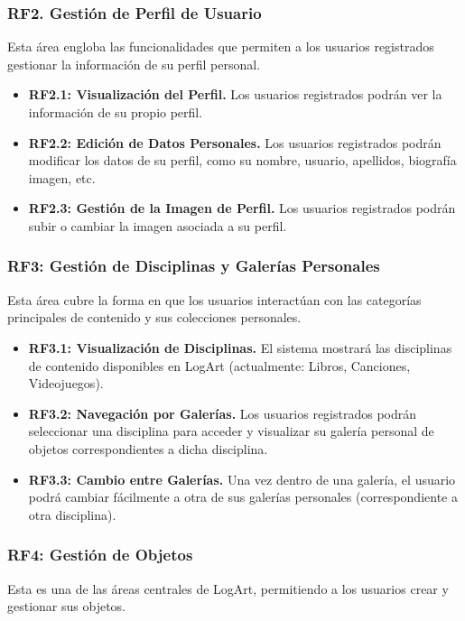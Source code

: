 \subsubsection{RF2. Gestión de Perfil de Usuario}
\label{rf:perfilUsuario}
Esta área engloba las funcionalidades que permiten a los usuarios registrados gestionar la información de su perfil personal.

\begin{itemize}
    \item \textbf{RF2.1: Visualización del Perfil.} Los usuarios registrados podrán ver la información de su propio perfil.
    \item \textbf{RF2.2: Edición de Datos Personales.} Los usuarios registrados podrán modificar los datos de su perfil, como su nombre, usuario, apellidos, biografía imagen, etc.
    \item \textbf{RF2.3: Gestión de la Imagen de Perfil.} Los usuarios registrados podrán subir o cambiar la imagen asociada a su perfil.
    
\end{itemize}

\subsubsection{RF3: Gestión de Disciplinas y Galerías Personales}
\label{rf:disciplinasGalerias}
Esta área cubre la forma en que los usuarios interactúan con las categorías principales de contenido y sus colecciones personales.

\begin{itemize}
    \item \textbf{RF3.1: Visualización de Disciplinas.} El sistema mostrará las disciplinas de contenido disponibles en LogArt (actualmente: Libros, Canciones, Videojuegos).
    \item \textbf{RF3.2: Navegación por Galerías.} Los usuarios registrados podrán seleccionar una disciplina para acceder y visualizar su galería personal de objetos correspondientes a dicha disciplina.
    \item \textbf{RF3.3: Cambio entre Galerías.} Una vez dentro de una galería, el usuario podrá cambiar fácilmente a otra de sus galerías personales (correspondiente a otra disciplina).
\end{itemize}

\subsubsection{RF4: Gestión de Objetos}
\label{rf:gestionObjetos}
Esta es una de las áreas centrales de LogArt, permitiendo a los usuarios crear y gestionar sus objetos.

